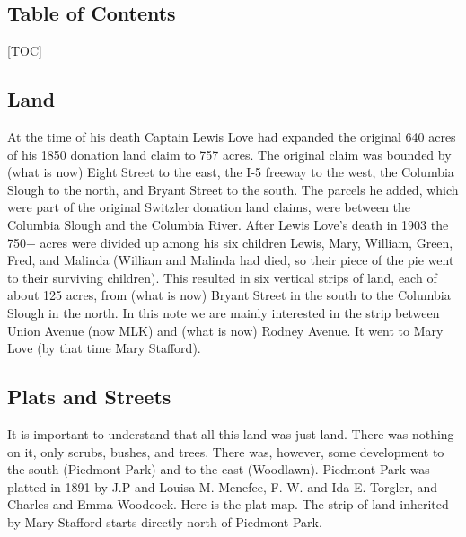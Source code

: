 \documentclass[
]{article}
\begin{document}
\hypertarget{table-of-contents}{%
\subsection{Table of Contents}\label{table-of-contents}}

{[}TOC{]}

\hypertarget{section}{%
\subsection{}\label{section}}

\hypertarget{land}{%
\subsection{Land}\label{land}}

At the time of his death Captain Lewis Love had expanded the original
640 acres of his 1850 donation land claim to 757 acres. The original
claim was bounded by (what is now) Eight Street to the east, the I-5
freeway to the west, the Columbia Slough to the north, and Bryant Street
to the south. The parcels he added, which were part of the original
Switzler donation land claims, were between the Columbia Slough and the
Columbia River. After Lewis Love's death in 1903 the 750+ acres were
divided up among his six children Lewis, Mary, William, Green, Fred, and
Malinda (William and Malinda had died, so their piece of the pie went to
their surviving children). This resulted in six vertical strips of land,
each of about 125 acres, from (what is now) Bryant Street in the south
to the Columbia Slough in the north. In this note we are mainly
interested in the strip between Union Avenue (now MLK) and (what is now)
Rodney Avenue. It went to Mary Love (by that time Mary Stafford).

\hypertarget{section-1}{%
\subsection{}\label{section-1}}

\hypertarget{plats-and-streets}{%
\subsection{Plats and Streets}\label{plats-and-streets}}

It is important to understand that all this land was just land. There
was nothing on it, only scrubs, bushes, and trees. There was, however,
some development to the south (Piedmont Park) and to the east
(Woodlawn). Piedmont Park was platted in 1891 by J.P and Louisa M.
Menefee, F. W. and Ida E. Torgler, and Charles and Emma Woodcock. Here
is the plat map. The strip of land inherited by Mary Stafford starts
directly north of Piedmont Park.
\end{document}
